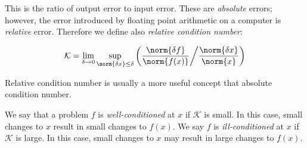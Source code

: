 This is the ratio of output error to input error. These are \emph{absolute} errors; however, the error introduced by floating point arithmetic on a computer is \emph{relative} error. Therefore we define also \emph{relative condition number}:

\begin{equation}
\mathcal{K} = \lim_{\delta \rightarrow 0} \sup_{\norm{\delta x} \leq \delta} \left({ \frac{\norm{\delta f}}{\norm{f(x)}} } \middle/ { \frac{\norm{\delta x}}{\norm{x}} }\right)
\label{def:relativeconditionnumber}
\end{equation}

Relative condition number is usually a more useful concept that absolute condition number.

We say that a problem $f$ is \emph{well-conditioned} at $x$ if $\mathcal{K}$ is small. In this case, small changes to $x$ result in small changes to $f(x)$. We say $f$ is \emph{ill-conditioned} at $x$ if $\mathcal{K}$ is large. In this case, small changes to $x$ may result in large changes to $f(x)$. 

